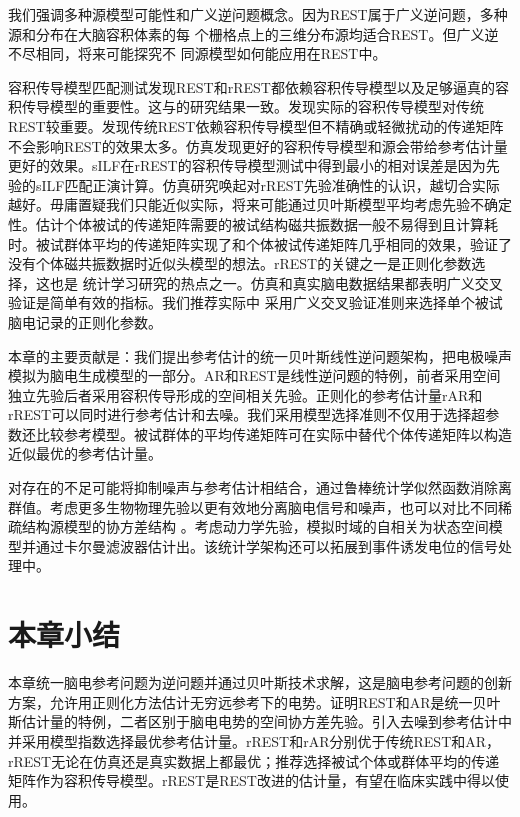 我们强调多种源模型可能性和广义逆问题概念。因为REST属于广义逆问题，多种源和分布在大脑容积体素的每
个栅格点上的三维分布源均适合REST。但广义逆不尽相同，将来可能探究不
同源模型如何能应用在REST中。

容积传导模型匹配测试发现REST和rREST都依赖容积传导模型以及足够逼真的容积传导模型的重要性。这与的研究结果一致。\cite{liu_q_estimating_2015}发现实际的容积传导模型对传统REST较重要。\cite{hu_how_2018}发现传统REST依赖容积传导模型但不精确或轻微扰动的传递矩阵不会影响REST的效果太多。仿真发现更好的容积传导模型和源会带给参考估计量更好的效果。sILF在rREST的容积传导模型测试中得到最小的相对误差是因为先验的sILF匹配正演计算。仿真研究唤起对rREST先验准确性的认识，越切合实际越好。毋庸置疑我们只能近似实际，将来可能通过贝叶斯模型平均考虑先验不确定性。估计个体被试的传递矩阵需要的被试结构磁共振数据一般不易得到且计算耗时。被试群体平均的传递矩阵实现了和个体被试传递矩阵几乎相同的效果，验证了没有个体磁共振数据时近似头模型的想法。rREST的关键之一是正则化参数选择，这也是
统计学习研究的热点之一。仿真和真实脑电数据结果都表明广义交叉验证是简单有效的指标。我们推荐实际中
采用广义交叉验证准则来选择单个被试脑电记录的正则化参数。

本章的主要贡献是：我们提出参考估计的统一贝叶斯线性逆问题架构，把电极噪声模拟为脑电生成模型的一部分。AR和REST是线性逆问题的特例，前者采用空间独立先验后者采用容积传导形成的空间相关先验。正则化的参考估计量rAR和rREST可以同时进行参考估计和去噪。我们采用模型选择准则不仅用于选择超参数还比较参考模型。被试群体的平均传递矩阵可在实际中替代个体传递矩阵以构造近似最优的参考估计量。

对存在的不足可能将抑制噪声与参考估计相结合，通过鲁棒统计学似然函数消除离群值。考虑更多生物物理先验以更有效地分离脑电信号和噪声，也可以对比不同稀疏结构源模型的协方差结构
。考虑动力学先验，模拟时域的自相关为状态空间模型并通过卡尔曼滤波器估计出。该统计学架构还可以拓展到事件诱发电位的信号处理中。

\section{本章小结}
本章统一脑电参考问题为逆问题并通过贝叶斯技术求解，这是脑电参考问题的创新方案，允许用正则化方法估计无穷远参考下的电势。证明REST和AR是统一贝叶斯估计量的特例，二者区别于脑电电势的空间协方差先验。引入去噪到参考估计中并采用模型指数选择最优参考估计量。rREST和rAR分别优于传统REST和AR，rREST无论在仿真还是真实数据上都最优；推荐选择被试个体或群体平均的传递矩阵作为容积传导模型。rREST是REST改进的估计量，有望在临床实践中得以使用。